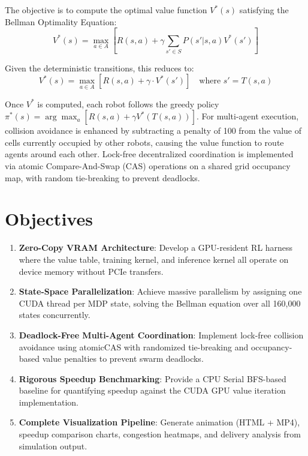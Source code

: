 \documentclass[12pt,a4paper]{article}
\begin{document}
The objective is to compute the optimal value function $V^*(s)$ satisfying the Bellman Optimality Equation:
\begin{equation}
    V^*(s) = \max_{a \in A} \left[ R(s,a) + \gamma \sum_{s' \in S} P(s'|s,a) V^*(s') \right]
\end{equation}

Given the deterministic transitions, this reduces to:
\begin{equation}
    V^*(s) = \max_{a \in A} \left[ R(s,a) + \gamma \cdot V^*(s') \right] \quad \text{where } s' = T(s,a)
\end{equation}

Once $V^*$ is computed, each robot follows the greedy policy $\pi^*(s) = \arg\max_a [R(s,a) + \gamma V^*(T(s,a))]$. For multi-agent execution, collision avoidance is enhanced by subtracting a penalty of 100 from the value of cells currently occupied by other robots, causing the value function to route agents around each other. Lock-free decentralized coordination is implemented via atomic Compare-And-Swap (CAS) operations on a shared grid occupancy map, with random tie-breaking to prevent deadlocks.

\newpage
\section{Objectives}
\begin{enumerate}
    \item \textbf{Zero-Copy VRAM Architecture}: Develop a GPU-resident RL harness where the value table, training kernel, and inference kernel all operate on device memory without PCIe transfers.
    \item \textbf{State-Space Parallelization}: Achieve massive parallelism by assigning one CUDA thread per MDP state, solving the Bellman equation over all 160,000 states concurrently.
    \item \textbf{Deadlock-Free Multi-Agent Coordination}: Implement lock-free collision avoidance using atomicCAS with randomized tie-breaking and occupancy-based value penalties to prevent swarm deadlocks.
    \item \textbf{Rigorous Speedup Benchmarking}: Provide a CPU Serial BFS-based baseline for quantifying speedup against the CUDA GPU value iteration implementation.
    \item \textbf{Complete Visualization Pipeline}: Generate animation (HTML + MP4), speedup comparison charts, congestion heatmaps, and delivery analysis from simulation output.
\end{enumerate}
\end{document}
